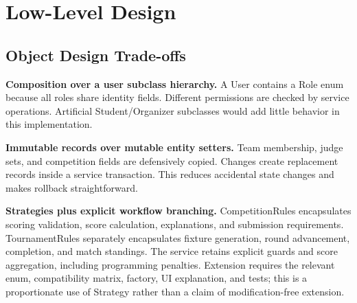 \documentclass[12pt]{article}
\begin{document}
\clearpage\section{Low-Level Design}
\subsection{Object Design Trade-offs}
\textbf{Composition over a user subclass hierarchy.} A User contains a Role enum because all roles share identity fields. Different permissions are checked by service operations. Artificial Student/Organizer subclasses would add little behavior in this implementation.

\textbf{Immutable records over mutable entity setters.} Team membership, judge sets, and competition fields are defensively copied. Changes create replacement records inside a service transaction. This reduces accidental state changes and makes rollback straightforward.

\textbf{Strategies plus explicit workflow branching.} CompetitionRules encapsulates scoring validation, score calculation, explanations, and submission requirements. TournamentRules separately encapsulates fixture generation, round advancement, completion, and match standings. The service retains explicit guards and score aggregation, including programming penalties. Extension requires the relevant enum, compatibility matrix, factory, UI explanation, and tests; this is a proportionate use of Strategy rather than a claim of modification-free extension.
\end{document}
